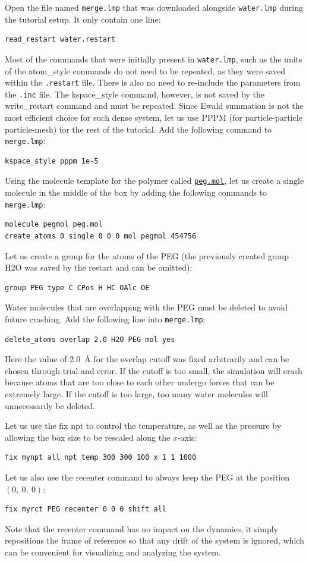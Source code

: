 \documentclass[9pt,tutorial]{livecoms}
\newcommand{\lmpcmd}[1]{\hspace{0pt}\colorbox{listing}{\textcolor{command}{\small{#1}}}\hspace{0pt}} %
\newcommand{\flecmd}[1]{\textcolor{command}{\texttt{#1}}} %
\newcommand{\dwlcmd}[1]{\textcolor{download}{\texttt{#1}}} %
\newcommand{\filepath}{https://raw.githubusercontent.com/lammpstutorials/lammpstutorials-article/main/files/}
\begin{document}
Open the file named \flecmd{merge.lmp} that was downloaded
alongside \flecmd{water.lmp} during the tutorial setup.  It only contain one line:
\begin{lstlisting}
read_restart water.restart
\end{lstlisting}
Most of the commands that were initially present in \flecmd{water.lmp}, such as
the \lmpcmd{units} of the \lmpcmd{atom\_style} commands do not need to be repeated,
as they were saved within the \flecmd{.restart} file.  There is also no need to
re-include the parameters from the \flecmd{.inc} file.  The \lmpcmd{kspace\_style}
command, however, is not saved by the \lmpcmd{write\_restart} command and must be
repeated.  Since Ewald summation is not the most efficient choice for such dense
system, let us use PPPM (for particle-particle particle-mesh) for the rest
of the tutorial.  Add the following command to \flecmd{merge.lmp}:
\begin{lstlisting}
kspace_style pppm 1e-5
\end{lstlisting}
Using the molecule template for the polymer called
\href{\filepath tutorial3/peg.mol}{\dwlcmd{peg.mol}},
let us create a single molecule in the middle of the box by adding the following
commands to \flecmd{merge.lmp}:
\begin{lstlisting}
molecule pegmol peg.mol
create_atoms 0 single 0 0 0 mol pegmol 454756
\end{lstlisting}
Let us create a group for the atoms of the PEG (the previously created
group H2O was saved by the restart and can be omitted):
\begin{lstlisting}
group PEG type C CPos H HC OAlc OE
\end{lstlisting}
Water molecules that are overlapping with the PEG must be deleted to avoid future
crashing.  Add the following line into \flecmd{merge.lmp}:
\begin{lstlisting}
delete_atoms overlap 2.0 H2O PEG mol yes
\end{lstlisting}
Here the value of 2.0~Å for the overlap cutoff was fixed arbitrarily and can
be chosen through trial and error.  If the cutoff is too small, the simulation will
crash because atoms that are too close to each other undergo forces
that can be extremely large.  If the cutoff is too large, too many water
molecules will unnecessarily be deleted.

Let us use the \lmpcmd{fix npt} to control the temperature, as
well as the pressure by allowing the box size to be rescaled along the $x$-axis:
\begin{lstlisting}
fix mynpt all npt temp 300 300 100 x 1 1 1000
\end{lstlisting}
Let us also use the \lmpcmd{recenter} command to always keep the PEG at
the position $(0,~0,~0)$:
\begin{lstlisting}
fix myrct PEG recenter 0 0 0 shift all
\end{lstlisting}
Note that the \lmpcmd{recenter} command has no impact on the dynamics,
it simply repositions the frame of reference so that any drift of the
system is ignored, which can be convenient for visualizing and analyzing
the system.
\end{document}
